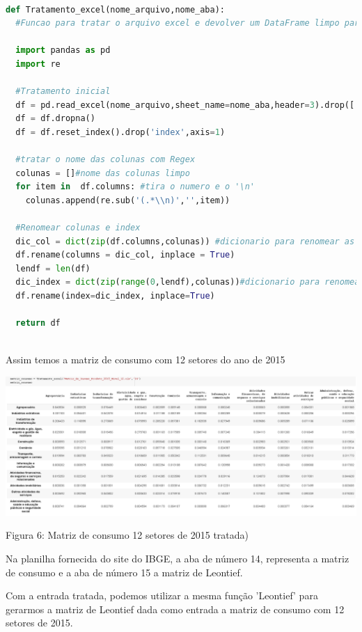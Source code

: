 \documentclass[a4paper, 12pt]{article}
\begin{document}
\begin{lstlisting}[language=Python, caption=Tratamento Excel, label=listing_trat_excel]

def Tratamento_excel(nome_arquivo,nome_aba): 
  #Funcao para tratar o arquivo excel e devolver um DataFrame limpo para ser utilizado
  
  import pandas as pd
  import re
 
  #Tratamento inicial
  df = pd.read_excel(nome_arquivo,sheet_name=nome_aba,header=3).drop(['Unnamed: 0','Unnamed: 1'],axis=1)
  df = df.dropna()
  df = df.reset_index().drop('index',axis=1)

  #tratar o nome das colunas com Regex
  colunas = []#nome das colunas limpo
  for item in  df.columns: #tira o numero e o '\n' 
    colunas.append(re.sub('(.*\\n)','',item))

  #Renomear colunas e index
  dic_col = dict(zip(df.columns,colunas)) #dicionario para renomear as colunas
  df.rename(columns = dic_col, inplace = True)
  lendf = len(df)
  dic_index = dict(zip(range(0,lendf),colunas))#dicionario para renomear os index
  df.rename(index=dic_index, inplace=True)
  
  return df
  
\end{lstlisting}
  
Assim temos a matriz de consumo com 12 setores do ano de 2015

 \begin{center}
    \includegraphics[width=16cm]{consumo_12_2015.PNG}
    
    Figura 6: Matriz de consumo 12 setores de 2015 tratada)
    
\end{center}

Na planilha fornecida do site do IBGE, a aba de número 14, representa a matriz de consumo e a aba de número 15 a matriz de Leontief.

Com a entrada tratada, podemos utilizar a mesma função 'Leontief' para gerarmos a matriz de Leontief dada como entrada a matriz de consumo com 12 setores de 2015.
\end{document}
